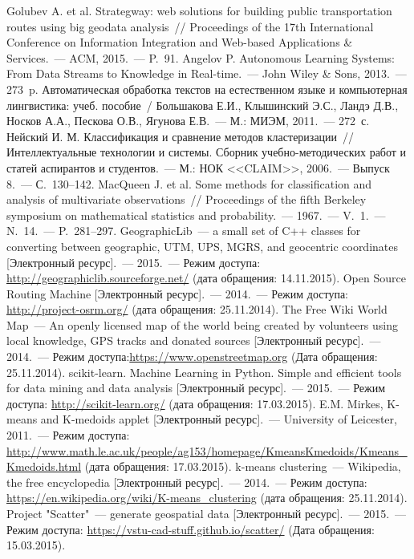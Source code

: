 \begin{thebibliography}{99}
     Golubev A. et al. Strategway: web solutions for building public transportation routes using big geodata analysis~// Proceedings of the 17th International Conference on Information Integration and Web-based Applications \& Services.~--- ACM, 2015.~--- P.~91.
     Angelov P. Autonomous Learning Systems: From Data Streams to Knowledge in Real-time.~--- John Wiley \& Sons, 2013.~--- 273~p.
     Автоматическая обработка текстов на естественном языке и компьютерная лингвистика: учеб. пособие~/ Большакова Е.И., Клышинский Э.С., Ландэ Д.В.,
Носков А.А., Пескова О.В., Ягунова Е.В.~--- М.: МИЭМ, 2011.~--- 272~с.
     Нейский И. М. Классификация и сравнение методов кластеризации~// Интеллектуальные технологии и системы. Сборник учебно-методических работ и статей аспирантов и студентов.~--- М.: НОК <<CLAIM>>, 2006.~--- Выпуск 8.~--- С.~130--142.
     MacQueen J. et al. Some methods for classification and analysis of multivariate observations~// Proceedings of the fifth Berkeley symposium on mathematical statistics and probability.~--- 1967.~--- V.~1.~--- N.~14.~--- P.~281--297.
     GeographicLib~--- a small set of C++ classes for converting between geographic, UTM, UPS, MGRS, and geocentric coordinates [Электронный ресурс].~--- 2015.~--- Режим доступа: \url{http://geographiclib.sourceforge.net/} (дата обращения: 14.11.2015).
     Open Source Routing Machine [Электронный ресурс].~--- 2014.~--- Режим доступа: \url{http://project-osrm.org/} (дата обращения: 25.11.2014).
     The Free Wiki World Map~--- An openly licensed map of the world being created by volunteers using local knowledge, GPS tracks and donated sources [Электронный ресурс].~--- 2014.~--- Режим доступа:\url{https://www.openstreetmap.org} (Дата обращения: 25.11.2014).
     scikit-learn. Machine Learning in Python. Simple and efficient tools for data mining and data analysis [Электронный ресурс].~--- 2015.~--- Режим доступа: \url{http://scikit-learn.org/} (дата обращения: 17.03.2015).
     E.M. Mirkes, K-means and K-medoids applet [Электронный ресурс].~--- University of Leicester, 2011.~--- Режим доступа: \url{http://www.math.le.ac.uk/people/ag153/homepage/KmeansKmedoids/Kmeans_Kmedoids.html} (дата обращения: 17.03.2015).
     k-means clustering~--- Wikipedia, the free encyclopedia [Электронный ресурс].~--- 2014.~--- Режим доступа: \url{https://en.wikipedia.org/wiki/K-means_clustering} (дата обращения: 25.11.2014).
     Project "Scatter"~--- generate geospatial data [Электронный ресурс].~--- 2015.~--- Режим доступа: \url{https://vstu-cad-stuff.github.io/scatter/} (Дата обращения: 15.03.2015).
\end{thebibliography}

\pagestyle{plain}